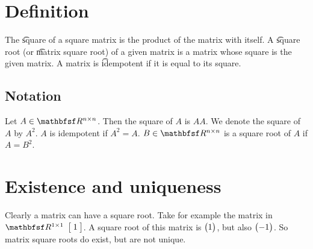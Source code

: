 

\section*{Definition}

The \t{square} of a square matrix is the product of the matrix with itself.
A \t{square root} (or \t{matrix square root}) of a given matrix is a matrix whose square is the given matrix.
A matrix is \t{idempotent} if it is equal to its square.

\subsection*{Notation}

Let $A \in \R ^{n \times  n}$.
Then the square of $A$ is $AA$.
We denote the square of $A$ by $A^2$.
$A$ is idempotent if $A^2 = A$.
$B \in \R ^{n \times  n}$ is a square root of $A$ if $A = B^2$.

\section*{Existence and uniqueness}

Clearly a matrix can have a square root.
Take for example the matrix in $\R ^{1 \times  1}$ $\bmat{1}$.
A square root of this matrix is $\begin{pmatrix}1\end{pmatrix}$, but also $\begin{pmatrix}-1\end{pmatrix}$.
So matrix square roots do exist, but are not unique.

\blankpage